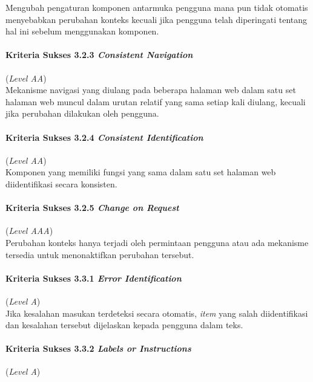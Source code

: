 Mengubah pengaturan komponen antarmuka pengguna mana pun tidak otomatis menyebabkan perubahan konteks kecuali jika pengguna telah diperingati tentang hal ini sebelum menggunakan komponen.

\paragraph{Kriteria Sukses 3.2.3 \textit{Consistent Navigation}}
\label{subsec:kriteria_3.2.3}
(\textit{Level AA}) \\

Mekanisme navigasi yang diulang pada beberapa halaman web dalam satu set halaman web muncul dalam urutan relatif yang sama setiap kali diulang, kecuali jika perubahan dilakukan oleh pengguna.

\paragraph{Kriteria Sukses 3.2.4 \textit{Consistent Identification}}
\label{subsec:kriteria_3.2.4}
(\textit{Level AA}) \\

Komponen yang memiliki fungsi yang sama dalam satu set halaman web diidentifikasi secara konsisten.

\paragraph{Kriteria Sukses 3.2.5 \textit{Change on Request}}
\label{subsec:kriteria_3.2.5}
(\textit{Level AAA}) \\

Perubahan konteks hanya terjadi oleh permintaan pengguna atau ada mekanisme tersedia untuk menonaktifkan perubahan tersebut.

\paragraph{Kriteria Sukses 3.3.1 \textit{Error Identification}}
\label{subsec:kriteria_3.3.1}
(\textit{Level A}) \\

Jika kesalahan masukan terdeteksi secara otomatis, \textit{item} yang salah diidentifikasi dan kesalahan tersebut dijelaskan kepada pengguna dalam teks.

\paragraph{Kriteria Sukses 3.3.2 \textit{Labels or Instructions}}
\label{subsec:kriteria_3.3.2}
(\textit{Level A}) \\

